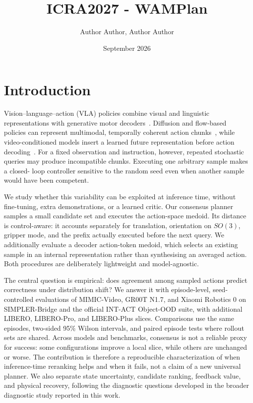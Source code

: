 \documentclass{article}
\title{ICRA2027 - WAMPlan}
\author{Author Author, Author Author}
\date{September 2026}
\begin{document}
\maketitle

\section{Introduction}

Vision--language--action (VLA) policies combine visual and linguistic
representations with generative motor decoders~\cite{rt1,rt2,octo,openvla}.
Diffusion and flow-based policies can represent multimodal, temporally coherent
action chunks~\cite{diffusionpolicy}, while video-conditioned models insert a
learned future representation before action decoding~\cite{cosmos,mimicvideo}.
For a fixed observation and instruction, however, repeated stochastic queries
may produce incompatible chunks. Executing one arbitrary sample makes a closed-
loop controller sensitive to the random seed even when another sample would have
been competent.

We study whether this variability can be exploited at inference time, without
fine-tuning, extra demonstrations, or a learned critic. Our consensus planner
samples a small candidate set and executes the action-space medoid. Its distance
is control-aware: it accounts separately for translation, orientation on
$SO(3)$, gripper mode, and the prefix actually executed before the next query.
We additionally evaluate a decoder action-token medoid, which selects an existing
sample in an internal representation rather than synthesising an averaged action.
Both procedures are deliberately lightweight and model-agnostic.

The central question is empirical: does agreement among sampled actions predict
correctness under distribution shift? We answer it with episode-level,
seed-controlled evaluations of MIMIC-Video, GR00T N1.7, and Xiaomi Robotics 0 on
SIMPLER-Bridge and the official INT-ACT Object-OOD suite, with additional LIBERO,
LIBERO-Pro, and LIBERO-Plus slices. Comparisons use the same episodes, two-sided
95\% Wilson intervals, and paired episode tests where rollout sets are shared.
Across models and benchmarks, consensus is not a reliable proxy for success:
some configurations improve a local slice, while others are unchanged or worse.
The contribution is therefore a reproducible characterization of when
inference-time reranking helps and when it fails, not a claim of a new universal
planner. We also separate state uncertainty, candidate ranking, feedback value,
and physical recovery, following the diagnostic questions developed in the
broader diagnostic study reported in this work.
\end{document}
